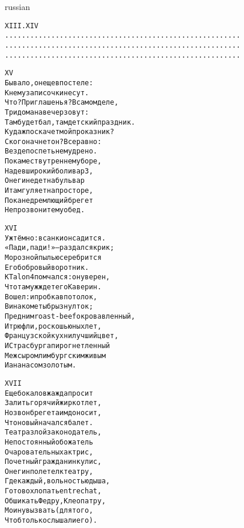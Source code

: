 \documentclass[12pt,twocolumn]{article}
\begin{document}
\begin{center}
\begin{otherlanguage*}{russian}
\begin{minipage}[t]{\dimexpr 0.5\textwidth -\tabcolsep-.5pt}
\begin{alltt}\normalfont\centering
XIII. XIV
 ........................................................
 ........................................................
 ........................................................
\end{alltt}
\end{minipage}
\vspace{4in}
\clearpage


\begin{minipage}[t]{\dimexpr 0.5\textwidth -\tabcolsep-.5pt}
\begin{alltt}\normalfont\centering
XV
Бывало, он еще в постеле:
К нему записочки несут.
Что? Приглашенья? В самом деле,
Три дома на вечер зовут:
Там будет бал, там детский праздник.
Куда ж поскачет мой проказник?
С кого начнет он? Все равно:
Везде поспеть немудрено.
Покамест в утреннем уборе,
Надев широкий боливар 3,
Онегин едет на бульвар
И там гуляет на просторе,
Пока недремлющий брегет
Не прозвонит ему обед.
\end{alltt}
\end{minipage}

\begin{minipage}[t]{\dimexpr 0.5\textwidth -\tabcolsep-.5pt}
\begin{alltt}\normalfont\centering
XVI
Уж тёмно: в санки он садится.
«Пади, пади!» — раздался крик;
Морозной пылью серебрится
Его бобровый воротник.
К Talon 4 помчался: он уверен,
Что там уж ждет его Каверин.
Вошел: и пробка в потолок,
Вина кометы брызнул ток;
Пред ним roast-beef окровавленный,
И трюфли, роскошь юных лет,
Французской кухни лучший цвет,
И Страсбурга пирог нетленный
Меж сыром лимбургским живым
И ананасом золотым.
\end{alltt}
\end{minipage}
\clearpage

\begin{minipage}[t]{\dimexpr 0.5\textwidth -\tabcolsep-.5pt}
\begin{alltt}\normalfont\centering
XVII
Еще бокалов жажда просит
Залить горячий жир котлет,
Но звон брегета им доносит,
Что новый начался балет.
Театра злой законодатель,
Непостоянный обожатель
Очаровательных актрис,
Почетный гражданин кулис,
Онегин полетел к театру,
Где каждый, вольностью дыша,
Готов охлопать entrechat,
Обшикать Федру, Клеопатру,
Моину вызвать (для того,
Чтоб только слышали его).
\end{alltt}
\end{minipage}


\end{otherlanguage*}
\end{center}
\end{document}
